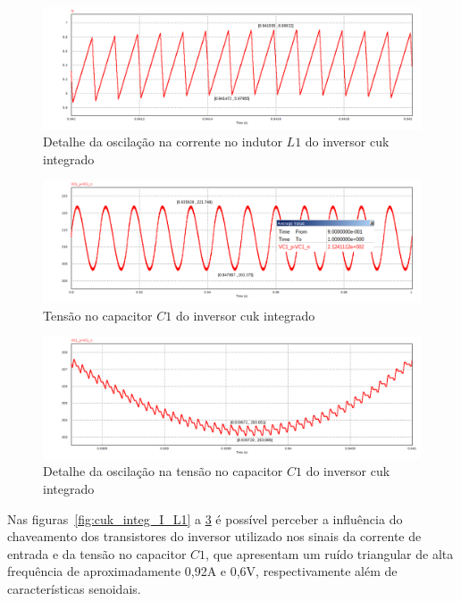 \documentclass[
	12pt,				%
	openany,
	onseside,
	a4paper,			%
	english,			%
	french,				%
	spanish,			%
	brazil,				%
	]{abntex2}
\begin{document}
\begin{figure}[H]%
	\centering
		\includegraphics[width= \linewidth]{cuk_integ_ripp_IL1}
		\caption{Detalhe da oscilação na corrente no indutor $L1$ do inversor cuk integrado}
		\label{fig:cuk_integ_ripp_I_L1}
\end{figure}

\begin{figure}[H]%
	\centering
		\includegraphics[width= \linewidth]{cuk_integ_VC1}
		\caption{Tensão no capacitor $C1$ do inversor cuk integrado}
		\label{fig:cuk_integ_V_C1}
\end{figure}

\begin{figure}[H]%
	\centering
		\includegraphics[width= \linewidth]{cuk_integ_ripp_VC1}
		\caption{Detalhe da oscilação na tensão no capacitor $C1$ do inversor cuk integrado}
		\label{fig:cuk_integ_ripp_V_C1}
\end{figure}

Nas figuras~\ref{fig:cuk_integ_I_L1} a \ref{fig:cuk_integ_ripp_V_C1} é possível perceber a influência do chaveamento dos transistores do inversor utilizado nos sinais da corrente de entrada e da tensão no capacitor $C1$, que apresentam um ruído triangular de alta frequência de aproximadamente 0,92A e 0,6V, respectivamente além de características senoidais.
\end{document}
